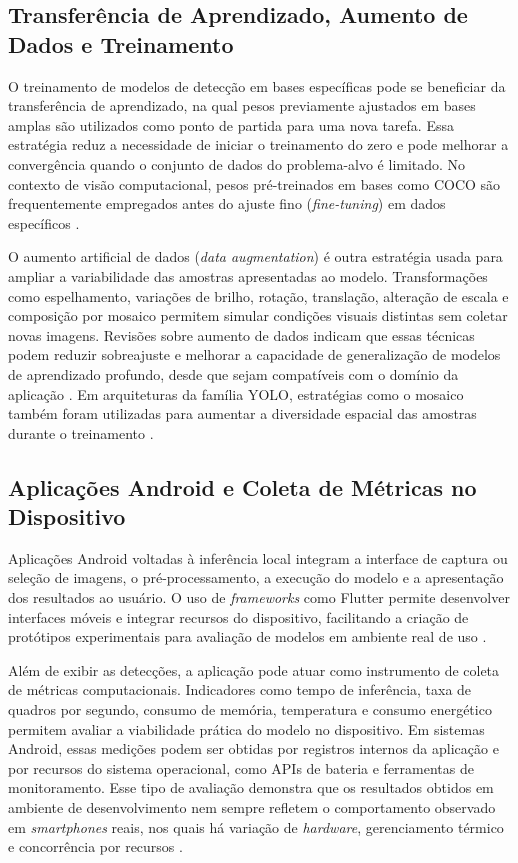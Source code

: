 \documentclass[artigo,times,capa]{iftex2024}
\begin{document}
\subsection{Transferência de Aprendizado, Aumento de Dados e Treinamento}

O treinamento de modelos de detecção em bases específicas pode se beneficiar da transferência de aprendizado, na qual pesos previamente ajustados em bases amplas são utilizados como ponto de partida para uma nova tarefa. Essa estratégia reduz a necessidade de iniciar o treinamento do zero e pode melhorar a convergência quando o conjunto de dados do problema-alvo é limitado. No contexto de visão computacional, pesos pré-treinados em bases como \ac{COCO} são frequentemente empregados antes do ajuste fino (\textit{fine-tuning}) em dados específicos \cite{Tan2018TransferLearning}.

O aumento artificial de dados (\textit{data augmentation}) é outra estratégia usada para ampliar a variabilidade das amostras apresentadas ao modelo. Transformações como espelhamento, variações de brilho, rotação, translação, alteração de escala e composição por mosaico permitem simular condições visuais distintas sem coletar novas imagens. Revisões sobre aumento de dados indicam que essas técnicas podem reduzir sobreajuste e melhorar a capacidade de generalização de modelos de aprendizado profundo, desde que sejam compatíveis com o domínio da aplicação \cite{Shorten2019,Mumuni2022DataAugmentation}. Em arquiteturas da família \ac{YOLO}, estratégias como o mosaico também foram utilizadas para aumentar a diversidade espacial das amostras durante o treinamento \cite{Bochkovskiy2020YOLOv4}.

\subsection{Aplicações Android e Coleta de Métricas no Dispositivo}

Aplicações Android voltadas à inferência local integram a interface de captura ou seleção de imagens, o pré-processamento, a execução do modelo e a apresentação dos resultados ao usuário. O uso de \textit{frameworks} como Flutter permite desenvolver interfaces móveis e integrar recursos do dispositivo, facilitando a criação de protótipos experimentais para avaliação de modelos em ambiente real de uso \cite{Flutter2024}.

Além de exibir as detecções, a aplicação pode atuar como instrumento de coleta de métricas computacionais. Indicadores como tempo de inferência, taxa de quadros por segundo, consumo de memória, temperatura e consumo energético permitem avaliar a viabilidade prática do modelo no dispositivo. Em sistemas Android, essas medições podem ser obtidas por registros internos da aplicação e por recursos do sistema operacional, como APIs de bateria e ferramentas de monitoramento. Esse tipo de avaliação demonstra que os resultados obtidos em ambiente de desenvolvimento nem sempre refletem o comportamento observado em \textit{smartphones} reais, nos quais há variação de \textit{hardware}, gerenciamento térmico e concorrência por recursos \cite{Chu2023nnPerf,Hirsch2025Exploring}.
 
\end{document}
